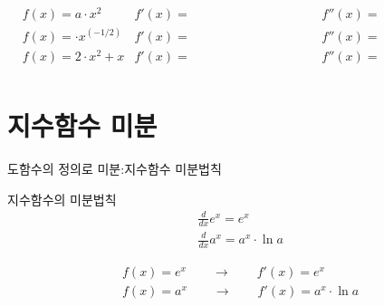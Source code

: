 \documentclass[aspectratio=169]{beamer}
\begin{document}
\begin{frame}%
  \begin{align*}
    & f(x) = a \cdot x^2      & f'(x) = \hspace{4cm} & f''(x) = \hspace{4cm} \\[2em]
    & f(x) = \cdot x^{(-1/2)}   & f'(x) = \hspace{4cm} & f''(x) = \hspace{4cm} \\[2em]
    & f(x) = 2 \cdot x^2 + x  & f'(x) = \hspace{4cm} & f''(x) = \hspace{4cm} \\[2em]
  \end{align*}
\end{frame}







\section{지수함수 미분}
% 
\begin{frame}{도함수의 정의로 미분:지수함수 미분법칙}
  \begin{block}{지수함수의 미분법칙}
    \begin{align*}
      & \frac{d}{dx} e^x = e^x \\
      & \frac{d}{dx} a^x = a^x \cdot \ln a   
    \end{align*}
  \end{block}
  \begin{align*}
    & f(x) = e^x \qquad \rightarrow \qquad f'(x) = e^x \\
    & f(x) = a^x \qquad \rightarrow \qquad  f'(x) = a^x \cdot \ln a
  \end{align*}
\end{frame}
\end{document}
